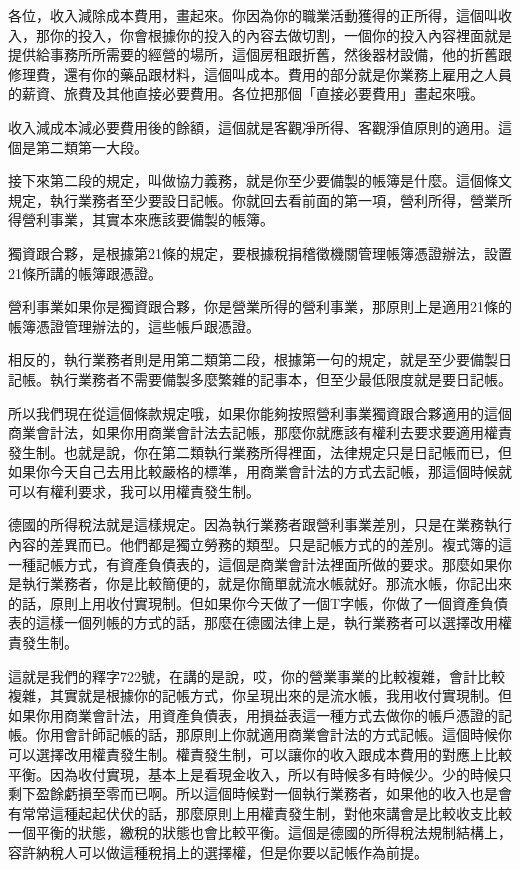 \documentclass[]{ctexbook}
\begin{document}
各位，收入減除成本費用，畫起來。你因為你的職業活動獲得的正所得，這個叫收入，那你的投入，你會根據你的投入的內容去做切割，一個你的投入內容裡面就是提供給事務所所需要的經營的場所，這個房租跟折舊，然後器材設備，他的折舊跟修理費，還有你的藥品跟材料，這個叫成本。費用的部分就是你業務上雇用之人員的薪資、旅費及其他直接必要費用。各位把那個「直接必要費用」畫起來哦。

收入減成本減必要費用後的餘額，這個就是客觀凈所得、客觀淨值原則的適用。這個是第二類第一大段。

接下來第二段的規定，叫做協力義務，就是你至少要備製的帳簿是什麼。這個條文規定，執行業務者至少要設日記帳。你就回去看前面的第一項，營利所得，營業所得營利事業，其實本來應該要備製的帳簿。

獨資跟合夥，是根據第21條的規定，要根據稅捐稽徵機關管理帳簿憑證辦法，設置21條所講的帳簿跟憑證。

營利事業如果你是獨資跟合夥，你是營業所得的營利事業，那原則上是適用21條的帳簿憑證管理辦法的，這些帳戶跟憑證。

相反的，執行業務者則是用第二類第二段，根據第一句的規定，就是至少要備製日記帳。執行業務者不需要備製多麼繁雜的記事本，但至少最低限度就是要日記帳。

所以我們現在從這個條款規定哦，如果你能夠按照營利事業獨資跟合夥適用的這個商業會計法，如果你用商業會計法去記帳，那麼你就應該有權利去要求要適用權責發生制。也就是說，你在第二類執行業務所得裡面，法律規定只是日記帳而已，但如果你今天自己去用比較嚴格的標準，用商業會計法的方式去記帳，那這個時候就可以有權利要求，我可以用權責發生制。

德國的所得稅法就是這樣規定。因為執行業務者跟營利事業差別，只是在業務執行內容的差異而已。他們都是獨立勞務的類型。只是記帳方式的的差別。複式簿的這一種記帳方式，有資產負債表的，這個是商業會計法裡面所做的要求。那麼如果你是執行業務者，你是比較簡便的，就是你簡單就流水帳就好。那流水帳，你記出來的話，原則上用收付實現制。但如果你今天做了一個T字帳，你做了一個資產負債表的這樣一個列帳的方式的話，那麼在德國法律上是，執行業務者可以選擇改用權責發生制。

這就是我們的釋字722號，在講的是說，哎，你的營業事業的比較複雜，會計比較複雜，其實就是根據你的記帳方式，你呈現出來的是流水帳，我用收付實現制。但如果你用商業會計法，用資產負債表，用損益表這一種方式去做你的帳戶憑證的記帳。你用會計師記帳的話，那原則上你就適用商業會計法的方式記帳。這個時候你可以選擇改用權責發生制。權責發生制，可以讓你的收入跟成本費用的對應上比較平衡。因為收付實現，基本上是看現金收入，所以有時候多有時候少。少的時候只剩下盈餘虧損至零而已啊。所以這個時候對一個執行業務者，如果他的收入也是會有常常這種起起伏伏的話，那麼原則上用權責發生制，對他來講會是比較收支比較一個平衡的狀態，繳稅的狀態也會比較平衡。這個是德國的所得稅法規制結構上，容許納稅人可以做這種稅捐上的選擇權，但是你要以記帳作為前提。
\end{document}

